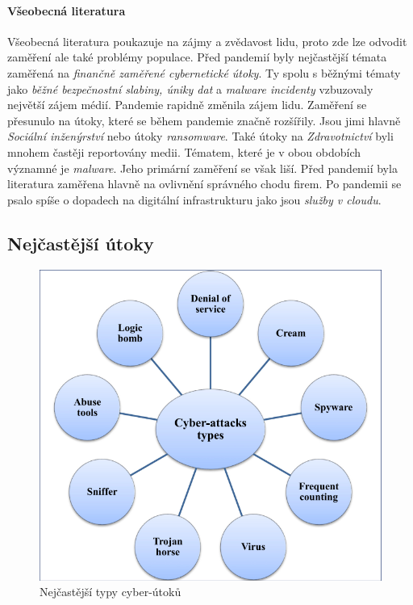 \paragraph{Všeobecná literatura}
Všeobecná literatura poukazuje na zájmy a zvědavost lidu, proto zde lze odvodit zaměření ale také problémy populace.
Před pandemií byly nejčastější témata zaměřená na \textit{finančně zaměřené cybernetické útoky}.
Ty spolu s běžnými tématy jako \textit{běžné bezpečnostní slabiny, úniky dat} a \textit{malware incidenty} vzbuzovaly největší zájem médií.\cite{KUMAR2022102821}
Pandemie rapidně změnila zájem lidu.
Zaměření se přesunulo na útoky, které se během pandemie značně rozšířily.
Jsou jimi hlavně \textit{Sociální inženýrství} nebo útoky \textit{ransomware}.
Také útoky na \textit{Zdravotnictví} byli mnohem častěji reportovány medii.
Tématem, které je v obou obdobích významné je \textit{malware}.
Jeho primární zaměření se však liší.
Před pandemií byla literatura zaměřena hlavně na ovlivnění správného chodu firem.
Po pandemii se psalo spíše o dopadech na digitální infrastrukturu jako jsou \textit{služby v cloudu}.

\subsection{Nejčastější útoky}

\begin{figure}[h]
	\centering
	\includegraphics[width=\linewidth]{images/cyber_attack_types}
	\caption{Nejčastější typy cyber-útoků}
	\label{fig:MostCommonAttacks}
\end{figure}

